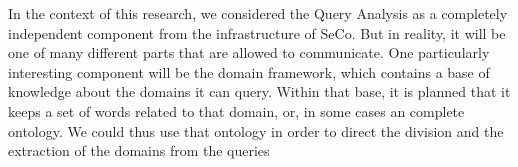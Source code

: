 In the context of this research, we considered the Query Analysis as a completely independent component from the infrastructure of SeCo. But in reality, it will be one of many different parts that are allowed to communicate. One particularly interesting component will be the domain framework, which contains a base of knowledge about the domains it can query. Within that base, it is planned  that it keeps a set of words related to that domain, or, in some cases an complete ontology. We could thus use that ontology in order to direct the division and the extraction of the domains from the queries



